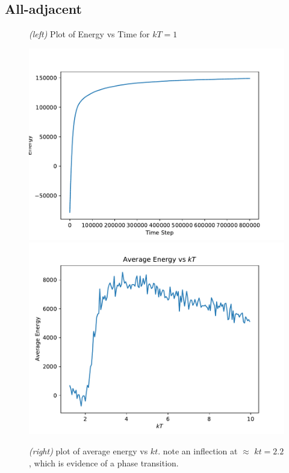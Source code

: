 \documentclass{article}
\begin{document}
\subsection*{All-adjacent}
\begin{figure}[H]
  \caption{\textit{(left)} Plot of Energy vs Time for $kT = 1$}
  \includegraphics[scale=0.35]{a_e_0.pdf}
  \includegraphics[scale=0.35]{a_avg_energy.pdf}
  \caption{\textit{(right)} plot of average energy vs $kt$.
    note an inflection at $\approx$ $kt = 2.2$, which is evidence of a
    phase transition.}
\end{figure}
\end{document}
